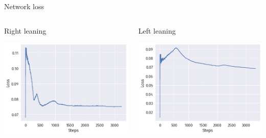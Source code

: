 \documentclass[bigger]{beamer}
\begin{document}
\begin{frame}[label={sec:org8f4cbeb}]{Network loss}
\begin{columns}
\begin{column}{0.5\columnwidth}
\centering
Right leaning
\begin{center}
\includegraphics[width=\columnwidth]{img/DRL-loss.png}
\end{center}
\end{column}
\begin{column}{0.5\columnwidth}
\centering
Left leaning
\begin{center}
\includegraphics[width=\columnwidth]{img/DRL-loss2.png}
\end{center}
\end{column}
\end{columns}
\end{frame}
\end{document}
